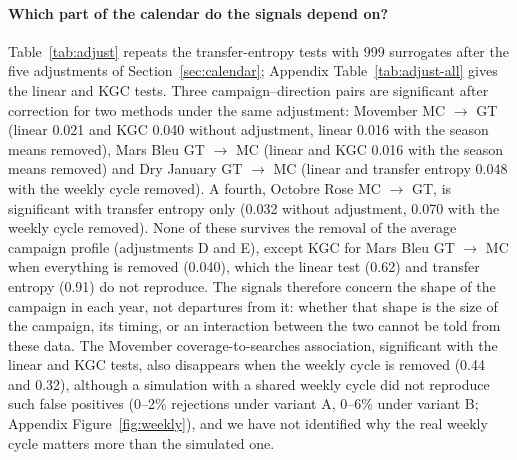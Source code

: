 \documentclass[11pt,a4paper]{article}
\begin{document}
\paragraph{Which part of the calendar do the signals depend on?} Table~\ref{tab:adjust} repeats the transfer-entropy tests with 999 surrogates after the five adjustments of Section~\ref{sec:calendar}; Appendix Table~\ref{tab:adjust-all} gives the linear and KGC tests. Three campaign--direction pairs are significant after correction for two methods under the same adjustment: Movember MC $\to$ GT (linear 0.021 and KGC 0.040 without adjustment, linear 0.016 with the season means removed), Mars Bleu GT $\to$ MC (linear and KGC 0.016 with the season means removed) and Dry January GT $\to$ MC (linear and transfer entropy 0.048 with the weekly cycle removed). A fourth, Octobre Rose MC $\to$ GT, is significant with transfer entropy only (0.032 without adjustment, 0.070 with the weekly cycle removed). None of these survives the removal of the average campaign profile (adjustments D and E), except KGC for Mars Bleu GT $\to$ MC when everything is removed (0.040), which the linear test (0.62) and transfer entropy (0.91) do not reproduce. The signals therefore concern the shape of the campaign in each year, not departures from it: whether that shape is the size of the campaign, its timing, or an interaction between the two cannot be told from these data. The Movember coverage-to-searches association, significant with the linear and KGC tests, also disappears when the weekly cycle is removed (0.44 and 0.32), although a simulation with a shared weekly cycle did not reproduce such false positives (0--2\% rejections under variant A, 0--6\% under variant B; Appendix Figure~\ref{fig:weekly}), and we have not identified why the real weekly cycle matters more than the simulated one.
\end{document}
